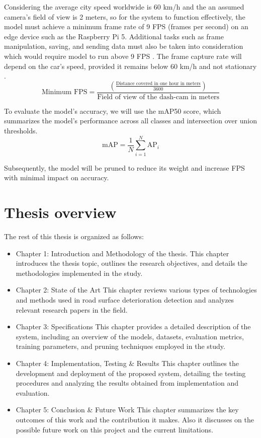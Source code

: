 Considering the average city speed worldwide is 60 km/h and the an assumed camera's field of view is 2 meters, so for the system to function effectively, the model must achieve a minimum frame rate of 9 FPS (frames per second) on an edge device such as the Raspberry Pi 5. Additional tasks such as frame manipulation, saving, and sending data must also be taken into consideration which would require model to run above 9 FPS . The frame capture rate will depend on the car's speed, provided it remains below 60 km/h and not stationary . 
\begin{equation}
\text{Minimum FPS}=\frac{\left(\frac{\text{Distance covered in one hour in meters}}{3600}\right)}{\text{Field of view of the dash-cam in meters}}
\label{framerate}
\end{equation}

To evaluate the model's accuracy, we will use the mAP50 score, which summarizes the model's performance across all classes and intersection over union thresholds.
\begin{equation}
\text{mAP} = \frac{1}{N} \sum_{i=1}^{N} \text{AP}_i
\end{equation}

Subsequently, the model will be pruned to reduce its weight and increase FPS with minimal impact on accuracy.

\section{Thesis overview}
The rest of this thesis is organized as follows:
\begin{itemize}
    \item Chapter 1: Introduction and Methodology of the thesis.
    \subitem This chapter introduces the thesis topic, outlines the research objectives, and details the methodologies implemented in the study.
    \item Chapter 2: State of the Art
    \subitem This chapter reviews various types of technologies and methods used in road surface deterioration detection and analyzes relevant research papers in the field.
    \item Chapter 3: Specifications
    \subitem This chapter provides a detailed description of the system, including an overview of the models, datasets, evaluation metrics, training parameters, and pruning techniques employed in the study.
    \item Chapter 4: Implementation, Testing \& Results
    \subitem This chapter outlines the development and deployment of the proposed system, detailing the testing procedures and analyzing the results obtained from implementation and evaluation. 
    \item Chapter 5: Conclusion \& Future Work 
    \subitem This chapter summarizes the key outcomes of this work and the contribution it makes. Also it discusses on the possible future work on this project and the current limitations.  
\end{itemize}







